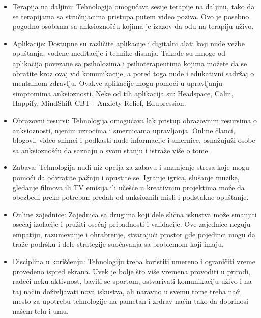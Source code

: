 \documentclass[a4paper]{article}
\begin{document}
            \begin{itemize}
              \item Terapija na daljinu: Tehnologija omogućava sesije terapije na daljinu, tako da se terapijama sa stručnjacima pristupa putem video poziva. Ovo je posebno pogodno osobama sa anksioznošću kojima je izazov da odu na terapiju uživo. 
              \item  Aplikacije: Dostupne su različite aplikacije i digitalni alati koji nude vežbe opuštanja, vođene meditacije i tehnike disanja. Takođe su mnoge od aplikacija povezane sa psiholozima i psihoterapeutima kojima možete da se obratite kroz ovaj vid komunikacije, a pored toga nude i edukativni sadržaj o mentalnom zdravlju. Ovakve aplikacije mogu pomoći u upravljanju simptomima anksioznosti. Neke od tih aplikacija su: Headspace, Calm, Happify, MindShift CBT - Anxiety Relief, Edupression.
              \item  Obrazovni resursi: Tehnologija omogućava lak pristup obrazovnim resursima o anksioznosti, njenim uzrocima i smernicama upravljanja. Online članci, blogovi, video snimci i podkasti nude informacije i smernice, osnažujuži osobe sa anksioznošću da saznaju o svom stanju i istraže više o tome.
              \item Zabava: Tehnologija nudi niz opcija za zabavu i smanjenje stresa koje mogu pomoći da odvratite pažnju i opustite se. Igranje igrica, slušanje muzike, gledanje filmova ili TV emisija ili učešće u kreativnim projektima može da obezbedi preko potreban predah od anksioznih misli i podstakne opuštanje.

               \item Online zajednice: Zajednica sa drugima koji dele slična iskustva može smanjiti osećaj izolacije i pružiti osećaj pripadnosti i validacije. Ove zajednice neguju empatiju, razumevanje i ohrabrenje, stvarajući prostor gde pojedinci mogu da traže podršku i dele strategije suočavanja sa problemom koji imaju.
               \item Disciplina u korišćenju: Tehnologiju treba koristiti umereno i ograničiti vreme provedeno ispred ekrana. Uvek je bolje što više vremena provoditi u prirodi, radeći neku aktivnost, baviti se sportom, ostvarivati komunikaciju uživo i na taj način doživljavati nova iskustva, ali naravno u svemu tome treba naći mesto za upotrebu tehnologije na pametan i zrdrav način tako da doprinosi našem telu i umu.
            \end{itemize}
            
\end{document}
